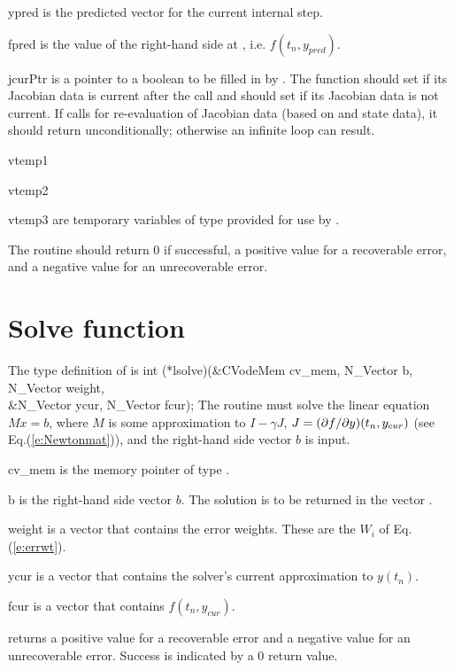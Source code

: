 {\begin{args}[convfail]
   \item[ypred]
     is the predicted  vector for the current {\cvode} internal step.
  
   \item[fpred]
     is the value of the right-hand side at , i.e. $f(t_n, y_{pred})$.
  
   \item[jcurPtr]
     is a pointer to a boolean to be filled in by .  
     The function should set  if its Jacobian 
     data is current after the call and should set         
      if its Jacobian data is not current.   
     If  calls for re-evaluation of         
     Jacobian data (based on  and {\cvode} state      
     data), it should return  unconditionally;
     otherwise an infinite loop can result.                
    
   \item[vtemp1] 
   \item[vtemp2]
   \item[vtemp3] 
     are temporary variables of type  provided for use by .
   \end{args}
}
{
  The  routine should return $0$ if successful,            
  a positive value for a recoverable error, and a negative value  
  for an unrecoverable error.  
}
{}


\section{Solve function}
The type definition of  is
{
  int (*lsolve)(&CVodeMem cv\_mem, N\_Vector b, N\_Vector weight, \\
                &N\_Vector ycur, N\_Vector fcur);  
}
{
  The routine  must solve the linear equation $M x = b$, where         
  $M$ is some approximation to $I - \gamma J$, $J = (\partial f / \partial y)(t_n, y_{cur})$
  (see Eq.(\ref{e:Newtonmat})), and the right-hand side vector $b$ is input. 
}
{
  \begin{args}[cv\_mem]
  \item[cv\_mem]
    is the {\cvode} memory pointer of type .
  \item[b]
    is the right-hand side vector $b$. The solution is to be    
    returned in the vector .
  \item[weight]
    is a vector that contains the error weights.
    These are the $W_i$ of Eq.(\ref{e:errwt}).
  \item[ycur]
    is a vector that contains the solver's current approximation to $y(t_n)$.
  \item[fcur]
    is a vector that contains $f(t_n,y_{cur})$. 
  \end{args}
}
{
   returns a positive value    
  for a recoverable error and a negative value for an             
  unrecoverable error. Success is indicated by a $0$ return value.
}
{}

